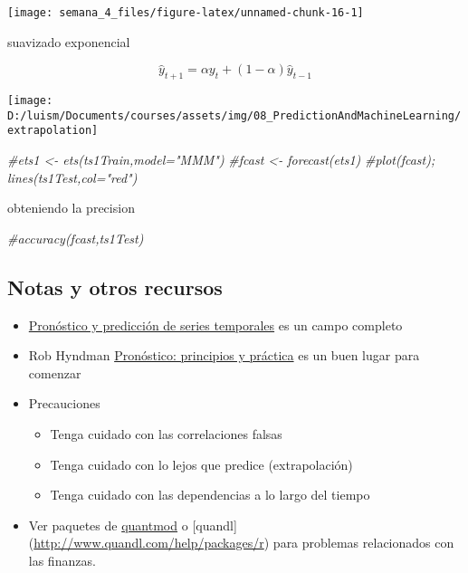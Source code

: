 \documentclass[
]{article}
\newenvironment{Shaded}{\begin{snugshade}}{\end{snugshade}}
\newcommand{\CommentTok}[1]{\textcolor[rgb]{0.56,0.35,0.01}{\textit{#1}}}
\providecommand{\tightlist}{%
  \setlength{\itemsep}{0pt}\setlength{\parskip}{0pt}}
\begin{document}
\begin{center}\texttt{[image: semana\_4\_files/figure-latex/unnamed-chunk-16-1]} \end{center}

suavizado exponencial

\[\hat{y}_{t+1} = \alpha y_t + (1-\alpha)\hat{y}_{t-1}\]

\begin{center}\texttt{[image: D:/luism/Documents/courses/assets/img/08\_PredictionAndMachineLearning/extrapolation]} \end{center}

\begin{Shaded}
\begin{Highlighting}[]
\CommentTok{\#ets1 \textless{}{-} ets(ts1Train,model="MMM")}
\CommentTok{\#fcast \textless{}{-} forecast(ets1)}
\CommentTok{\#plot(fcast); lines(ts1Test,col="red")}
\end{Highlighting}
\end{Shaded}

obteniendo la precision

\begin{Shaded}
\begin{Highlighting}[]
\CommentTok{\#accuracy(fcast,ts1Test)}
\end{Highlighting}
\end{Shaded}

\hypertarget{notas-y-otros-recursos-1}{%
\subsection{Notas y otros recursos}\label{notas-y-otros-recursos-1}}

\begin{itemize}
\tightlist
\item
  \href{http://en.wikipedia.org/wiki/Forecasting}{Pronóstico y
  predicción de series temporales} es un campo completo
\item
  Rob Hyndman \href{https://www.otexts.org/fpp/}{Pronóstico: principios
  y práctica} es un buen lugar para comenzar
\item
  Precauciones

  \begin{itemize}
  \tightlist
  \item
    Tenga cuidado con las correlaciones falsas
  \item
    Tenga cuidado con lo lejos que predice (extrapolación)
  \item
    Tenga cuidado con las dependencias a lo largo del tiempo
  \end{itemize}
\item
  Ver paquetes de
  \href{http://cran.r-project.org/web/packages/quantmod/quantmod.pdf}{quantmod}
  o {[}quandl{]} (\url{http://www.quandl.com/help/packages/r}) para
  problemas relacionados con las finanzas.
\end{itemize}
\end{document}
